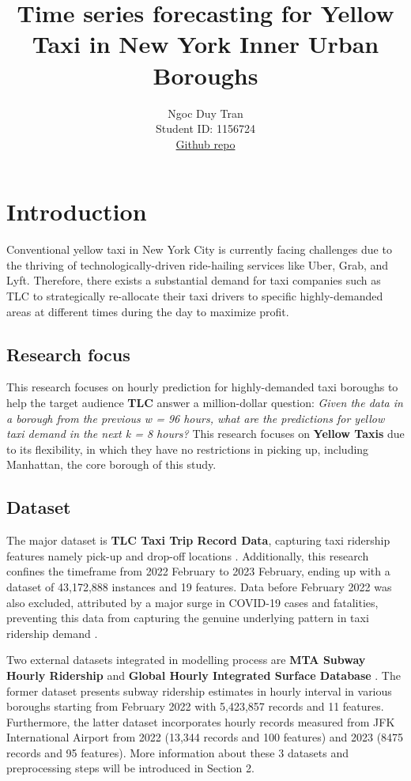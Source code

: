 \documentclass[11pt]{article}
\title{\textbf{Time series forecasting for Yellow Taxi in New York Inner Urban Boroughs}}
\author{
Ngoc Duy Tran \\
Student ID: 1156724 \\
\href{https://github.com/MAST30034-Applied-Data-Science/mast30034-project-1-dduygaucho.git}{Github repo}
}
\begin{document}
\maketitle

\section{Introduction}
Conventional yellow taxi in New York City is currently facing challenges due to the thriving of technologically-driven ride-hailing services like Uber, Grab, and Lyft. Therefore, there exists a substantial demand for taxi companies such as TLC to strategically re-allocate their taxi drivers to specific highly-demanded areas at different times during the day to maximize profit.

\subsection{Research focus}

This research focuses on hourly prediction for highly-demanded taxi boroughs to help the target audience \textbf{TLC} answer a million-dollar question: \textit{Given the data in a borough from the previous w = 96 hours, what are the predictions for yellow taxi demand in the next k = 8 hours?} This research focuses on \textbf{Yellow Taxis} due to its flexibility, in which they have no restrictions in picking up, including Manhattan, the core borough of this study. 
\subsection{Dataset}
The major dataset is \textbf{TLC Taxi Trip Record Data}, capturing taxi ridership features namely pick-up and drop-off locations \cite{NYC-TLC}. Additionally, this research confines the timeframe from 2022 February to 2023 February, ending up with a dataset of 43,172,888 instances and 19 features. Data before February 2022  was also excluded, attributed by a major surge in COVID-19 cases and fatalities, preventing this data from capturing the genuine underlying pattern in taxi ridership demand \cite{NYT-Covid}.

Two external datasets integrated in modelling process are \textbf{MTA Subway Hourly Ridership} \cite{MTA-Ridership} and \textbf{Global Hourly Integrated Surface Database} \cite{NCEI-Surface}. The former dataset presents subway ridership estimates in hourly interval in various boroughs starting from February 2022 with 5,423,857 records and 11 features. Furthermore, the latter dataset incorporates hourly records measured from JFK International Airport from 2022 (13,344 records and 100 features) and 2023 (8475 records and 95 features). More information about these 3 datasets and preprocessing steps will be introduced in Section 2. 
\end{document}
